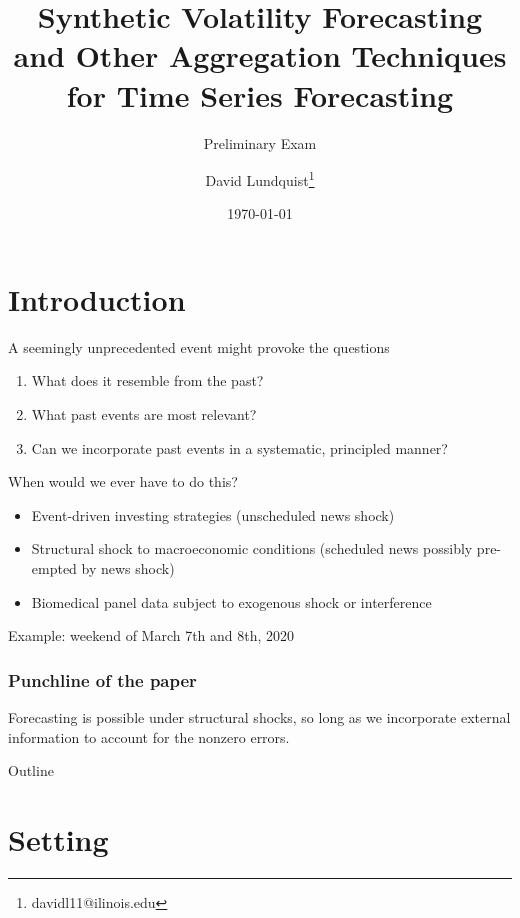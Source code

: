 \documentclass[pdf]{beamer}
\title{Synthetic Volatility Forecasting and Other Aggregation Techniques for Time Series Forecasting}
\subtitle{Preliminary Exam}
\author{David Lundquist\thanks{davidl11@ilinois.edu}}
\date{\today}
\begin{document}
\begin{frame}
\titlepage
\end{frame}

\section{Introduction}

\begin{frame}
A seemingly unprecedented event might provoke the questions

\begin{enumerate}
    \item What does it resemble from the past?
    \item What past events are most relevant?
    \item Can we incorporate past events in a systematic, principled manner? 
\end{enumerate}

\end{frame}
\begin{frame}
When would we ever have to do this?
    \begin{itemize}
        \item Event-driven investing strategies (unscheduled news shock) 
        \item Structural shock to macroeconomic conditions (scheduled news possibly pre-empted by news shock)
        \item Biomedical panel data subject to exogenous shock or interference
    \end{itemize}

Example: weekend of March 7th and 8th, 2020

\end{frame}

\begin{frame}

\frametitle{Punchline of the paper}

Forecasting is possible under structural shocks, so long as we incorporate external information to account for the nonzero errors.

\end{frame}

\begin{frame}{Outline}
    \tableofcontents
\end{frame}

\section{Setting}
\end{document}

